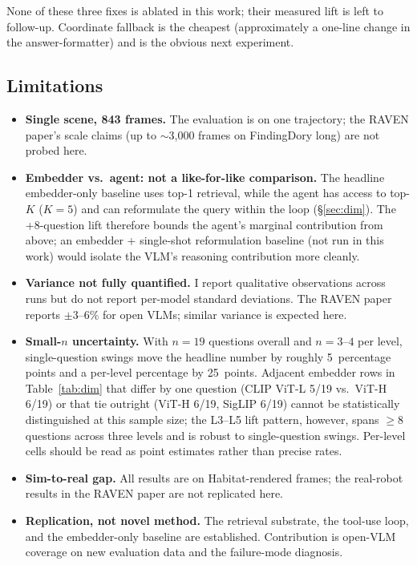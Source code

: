 \documentclass[12pt,letterpaper,oneside]{article}
\begin{document}
None of these three fixes is ablated in this work; their measured
lift is left to follow-up.  Coordinate fallback is the cheapest
(approximately a one-line change in the answer-formatter) and is
the obvious next experiment.

\subsection{Limitations}\label{sec:limitations}

\begin{itemize}
  \item \textbf{Single scene, 843 frames.}  The evaluation is on one
    trajectory; the RAVEN paper's scale claims (up to $\sim$3{,}000
    frames on FindingDory long) are not probed here.
  \item \textbf{Embedder vs.\ agent: not a like-for-like comparison.}
    The headline embedder-only baseline uses top-1 retrieval, while
    the agent has access to top-$K$ ($K{=}5$) and can reformulate
    the query within the loop (\S\ref{sec:dim}).  The +8-question
    lift therefore bounds the agent's marginal contribution from
    above; an embedder + single-shot reformulation baseline (not run
    in this work) would isolate the VLM's reasoning contribution
    more cleanly.
  \item \textbf{Variance not fully quantified.}  I report qualitative
    observations across runs but do not report per-model standard
    deviations.  The RAVEN paper reports $\pm3$--$6\%$ for open VLMs;
    similar variance is expected here.
  \item \textbf{Small-$n$ uncertainty.}  With $n=19$ questions
    overall and $n=3$--$4$ per level, single-question swings move
    the headline number by roughly 5~percentage points and a
    per-level percentage by 25~points. Adjacent embedder rows in
    Table~\ref{tab:dim} that differ by one question (CLIP ViT-L
    5/19 vs.\ ViT-H 6/19) or that tie outright (ViT-H 6/19, SigLIP
    6/19) cannot be statistically distinguished at this sample
    size; the L3--L5 lift pattern, however, spans $\geq 8$
    questions across three levels and is robust to single-question
    swings.  Per-level cells should be read as point estimates
    rather than precise rates.
  \item \textbf{Sim-to-real gap.}  All results are on Habitat-rendered
    frames; the real-robot results in the RAVEN paper are not
    replicated here.
  \item \textbf{Replication, not novel method.}  The retrieval
    substrate, the tool-use loop, and the embedder-only baseline are
    established.  Contribution is open-VLM coverage on new evaluation
    data and the failure-mode diagnosis.
\end{itemize}
\end{document}
